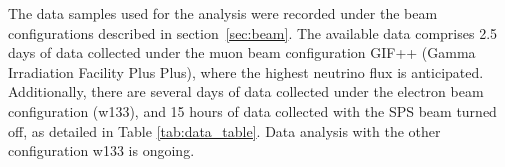 The data samples used for the analysis were recorded under the beam configurations described in section~\ref{sec:beam}.
The available data comprises 2.5 days of data collected under the muon beam configuration GIF++ (Gamma Irradiation Facility Plus Plus), where the highest neutrino flux is anticipated. Additionally, there are several days of data collected under the electron beam configuration (w133), and 15 hours of data collected with the SPS beam turned off, as detailed in Table \ref{tab:data_table}. Data analysis with the other configuration w133 is ongoing.


